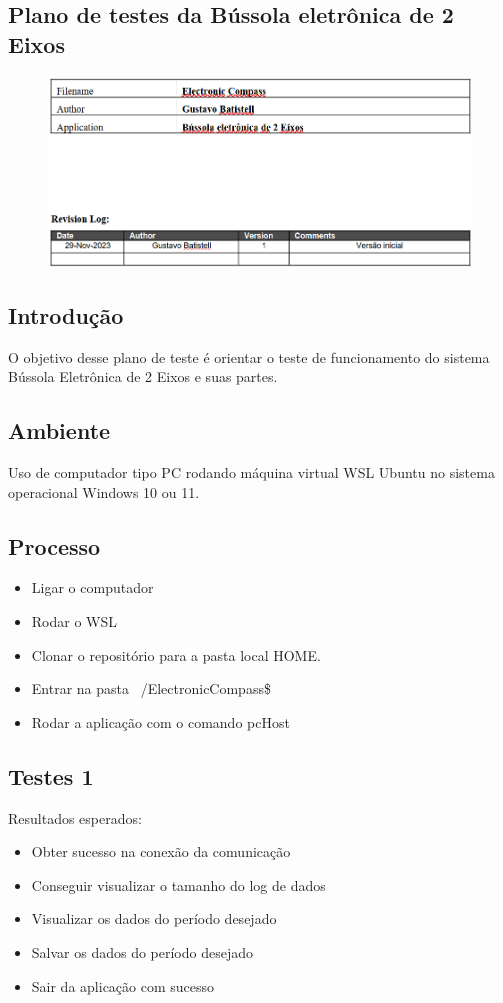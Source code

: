 \documentclass[10pt,twocolumn,letterpaper]{article}
\begin{document}
\onecolumn
{}
\label{apendice-d}

\subsection*{Plano de testes da Bússola eletrônica de 2 Eixos}
\begin{figure}[h]
  \centering
  \includegraphics[keepaspectratio=true,scale=0.44]{figures/PlanoTestes.png}
  \label{fig:plano-testes}
\end{figure}

\subsection*{Introdução}
O objetivo desse plano de teste é orientar o teste de funcionamento do sistema Bússola Eletrônica	de 2 Eixos e suas partes.
\subsection*{Ambiente}
Uso de computador tipo PC rodando máquina virtual WSL Ubuntu no sistema operacional Windows 10 ou 11.
\subsection*{Processo}
\begin{itemize}
  \item Ligar o computador
  \item Rodar o WSL
  \item Clonar o repositório \cite{src-github} para a pasta local HOME.
  \item Entrar na pasta ~/ElectronicCompass\$ 
  \item Rodar a aplicação com o comando pcHost
\end{itemize}

\subsection*{Testes 1}
Resultados esperados:
\begin{itemize}
  \item Obter sucesso na conexão da comunicação
  \item Conseguir visualizar o tamanho do log de dados
  \item Visualizar os dados do período desejado
  \item Salvar os dados do período desejado
  \item Sair da aplicação com sucesso
\end{itemize}
\end{document}
